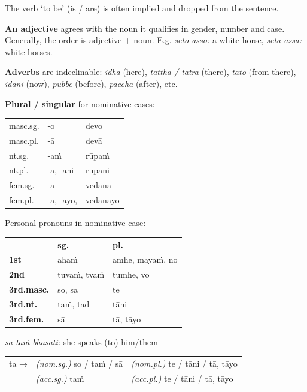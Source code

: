 \documentclass[11pt,oneside]{memoir}
\begin{document}
The verb `to be' (is / are) is often implied and dropped from the sentence.

\textbf{An adjective} agrees with the noun it qualifies in gender, number and case. \\
Generally, the order is adjective + noun. E.g. \emph{seto asso:} a white horse, \emph{setā assā:} white horses.

\textbf{Adverbs} are indeclinable: \emph{idha} (here), \emph{tattha / tatra} (there), \emph{tato}
(from there), \emph{idāni} (now), \emph{pubbe} (before), \emph{pacchā} (after), etc.

\bigskip

\begin{multicols}{2}

\textbf{Plural / singular} for nominative cases:

\begin{center}
\begin{tabular}{lll}
masc.sg. & -o & devo\\
masc.pl. & -ā & devā\\
\hline
nt.sg. & -aṁ & rūpaṁ\\
nt.pl. & -ā, -āni & rūpāni\\
\hline
fem.sg. & -ā & vedanā\\
fem.pl. & -ā, -āyo, & vedanāyo\\
\end{tabular}
\end{center}

\columnbreak

Personal pronouns in nominative case:

\begin{center}
\begin{tabular}{lll}
 & \textbf{sg.} & \textbf{pl.}\\
\textbf{1st} & ahaṁ & amhe, mayaṁ, no\\
\textbf{2nd} & tuvaṁ, tvaṁ & tumhe, vo\\
\textbf{3rd.masc.} & so, sa & te\\
\textbf{3rd.nt.} & taṁ, tad & tāni\\
\textbf{3rd.fem.} & sā & tā, tāyo\\
\end{tabular}
\end{center}

\emph{sā taṁ bhāsati:} she speaks (to) him/them

\vspace*{-\baselineskip}

\begin{center}
\begin{tabular}{lll}
ta → & \emph{(nom.sg.)} so / taṁ / sā & \emph{(nom.pl.)} te / tāni / tā, tāyo\\
 & \emph{(acc.sg.)} taṁ & \emph{(acc.pl.)}  te / tāni / tā, tāyo\\
\end{tabular}
\end{center}

\end{multicols}
\bigskip
\end{document}
